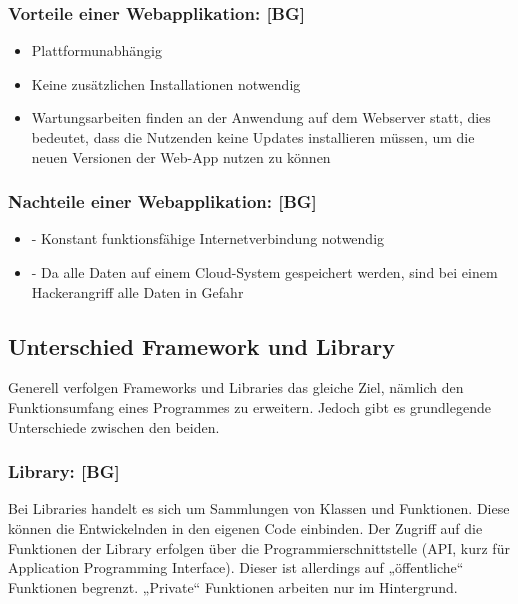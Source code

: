 \subsubsection{Vorteile einer Webapplikation: [BG]}

\begin{itemize}
  \item Plattformunabhängig
  \item Keine zusätzlichen Installationen notwendig
  \item Wartungsarbeiten finden an der Anwendung auf dem Webserver statt, dies bedeutet, dass die Nutzenden keine Updates installieren müssen, um die neuen Versionen der Web-App nutzen zu können
\end{itemize}

\subsubsection{Nachteile einer Webapplikation: [BG]}

\begin{itemize}
  \item -	Konstant funktionsfähige Internetverbindung notwendig
  \item -	Da alle Daten auf einem Cloud-System gespeichert werden, sind bei einem Hackerangriff alle Daten in Gefahr
\end{itemize}
\cite{WebApplikation} \cite{WebClientServer} \cite{dvsw}

\subsection{Unterschied Framework und Library}

Generell verfolgen Frameworks und Libraries das gleiche Ziel, nämlich den Funktionsumfang eines Programmes zu erweitern. Jedoch gibt es grundlegende Unterschiede zwischen den beiden.

\subsubsection{Library: [BG]}

Bei Libraries handelt es sich um Sammlungen von Klassen und Funktionen. Diese können die Entwickelnden in den eigenen Code einbinden. Der Zugriff auf die Funktionen der Library erfolgen über die Programmierschnittstelle (API, kurz für Application Programming Interface). Dieser ist allerdings auf „öffentliche“ Funktionen begrenzt. „Private“ Funktionen arbeiten nur im Hintergrund.

